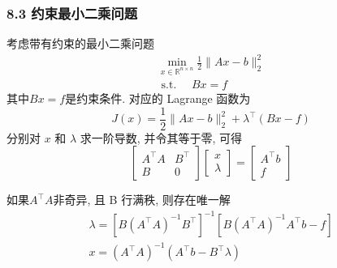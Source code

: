 \documentclass[notheorems,serif]{beamer}
\begin{document}
\begin{frame}
\frametitle{8.3 约束最小二乘问题}
考虑带有约束的最小二乘问题
\begin{equation}
\begin{array}{l}{\min _{x \in \mathbb{R}^{n \times n}} \frac{1}{2}\|A x-b\|_{2}^{2}} \\ {\text { s.t. } \quad B x=f}\end{array}
\end{equation}
其中$B x=f$是约束条件. 对应的 Lagrange 函数为
$$
J(x)=\frac{1}{2}\|A x-b\|_{2}^{2}+\lambda^{\top}(B x-f)
$$
分别对 $x$ 和 $\lambda$ 求一阶导数, 并令其等于零, 可得
$$
\left[\begin{array}{cc}{A^{\top} A} & {B^{\top}} \\ {B} & {0}\end{array}\right]\left[\begin{array}{l}{x} \\ {\lambda}\end{array}\right]=\left[\begin{array}{c}{A^{\top} b} \\ {f}\end{array}\right]
$$
\end{frame}

\begin{frame}
如果$A^{\top} A$非奇异, 且 B 行满秩, 则存在唯一解
$$
\begin{array}{l}{\lambda=\left[B\left(A^{\top} A\right)^{-1} B^{\top}\right]^{-1}\left[B\left(A^{\top} A\right)^{-1} A^{\top} b-f\right]} \\ {x=\left(A^{\top} A\right)^{-1}\left(A^{\top} b-B^{\top} \lambda\right)}\end{array}
$$
\end{frame}
\end{document}
